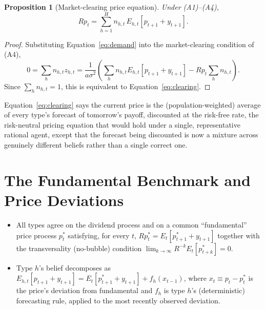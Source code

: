 \documentclass[11pt]{article}
\newtheorem{proposition}{Proposition}
\theoremstyle{remark}
\theoremstyle{definition}
\begin{document}
\begin{proposition}[Market-clearing price equation]
\label{prop:clearing}
Under (A1)--(A4),
\begin{equation}
Rp_t = \sum_{h=1}^{H} n_{h,t}\,E_{h,t}[p_{t+1}+y_{t+1}].
\label{eq:clearing}
\end{equation}
\end{proposition}
\begin{proof}
Substituting Equation~\eqref{eq:demand} into the market-clearing condition of (A4),
\begin{equation*}
0 = \sum_h n_{h,t}z_{h,t} = \frac{1}{a\sigma^2}\left(\sum_h n_{h,t}E_{h,t}[p_{t+1}+y_{t+1}] - Rp_t\sum_h n_{h,t}\right).
\end{equation*}
Since $\sum_h n_{h,t}=1$, this is equivalent to Equation~\eqref{eq:clearing}.
\end{proof}

Equation~\eqref{eq:clearing} says the current price is the (population-weighted) average of every type's forecast of tomorrow's payoff, discounted at the risk-free rate, the risk-neutral pricing equation that would hold under a single, representative rational agent, except that the forecast being discounted is now a mixture across genuinely different beliefs rather than a single correct one.

\section{The Fundamental Benchmark and Price Deviations}
\label{sec:fundamental}

\begin{itemize}
\item[(A5)] All types agree on the dividend process and on a common ``fundamental'' price process $p_t^*$ satisfying, for every $t$, $Rp_t^*=E_t[p_{t+1}^*+y_{t+1}]$ together with the transversality (no-bubble) condition $\lim_{k\to\infty}R^{-k}E_t[p_{t+k}^*]=0$.
\item[(A6)] Type $h$'s belief decomposes as $E_{h,t}[p_{t+1}+y_{t+1}] = E_t[p_{t+1}^*+y_{t+1}] + f_h(x_{t-1})$, where $x_t \equiv p_t-p_t^*$ is the price's deviation from fundamental and $f_h$ is type $h$'s (deterministic) forecasting rule, applied to the most recently observed deviation.
\end{itemize}
\end{document}
